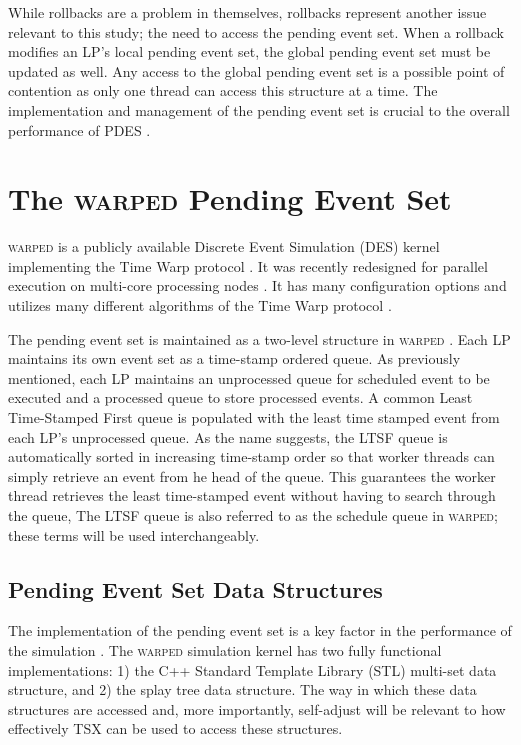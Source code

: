 \documentclass[11pt]{book}
\begin{document}
While rollbacks are a problem in themselves, rollbacks represent another issue relevant to
this study; the need to access the pending event set.  When a rollback modifies an LP's
local pending event set, the global pending event set must be updated as well.  Any access
to the global pending event set is a possible point of contention as only one thread can
access this structure at a time.  The implementation and management of the pending event
set is crucial to the overall performance of PDES \cite{twpes}.

\section{The \textsc{warped} Pending Event Set}

\textsc{warped} is a publicly available Discrete Event Simulation (DES) kernel implementing the
Time Warp protocol \cite{martin,fujimoto}.  It was recently redesigned for parallel
execution on multi-core processing nodes \cite{muthalagu}.  It has many configuration
options and utilizes many different algorithms of the Time Warp protocol \cite{fujimoto}.

The pending event set is maintained as a two-level structure in \textsc{warped} \cite{dickman}.
Each LP maintains its own event set as a time-stamp ordered queue.  As previously
mentioned, each LP maintains an unprocessed queue for scheduled event to be executed and a
processed queue to store processed events.  A common Least Time-Stamped First queue is
populated with the least time stamped event from each LP's unprocessed queue.
As the name suggests, the LTSF queue is automatically sorted in increasing
time-stamp order so that worker threads can simply retrieve an event from he
head of the queue.  This guarantees the worker thread retrieves the least
time-stamped event without having to search through the queue, The LTSF queue is
also referred to as the schedule queue in \textsc{warped}; these terms will be
used interchangeably.

\subsection{Pending Event Set Data Structures}

The implementation of the pending event set is a key factor in the performance
of the simulation \cite{twpes}.  The \textsc{warped} simulation kernel has two
fully functional implementations: 1) the C++ Standard Template Library (STL)
multi-set data structure, and 2) the splay tree data structure.  The way in
which these data structures are accessed and, more importantly, self-adjust will
be relevant to how effectively TSX can be used to access these structures.
\end{document}
